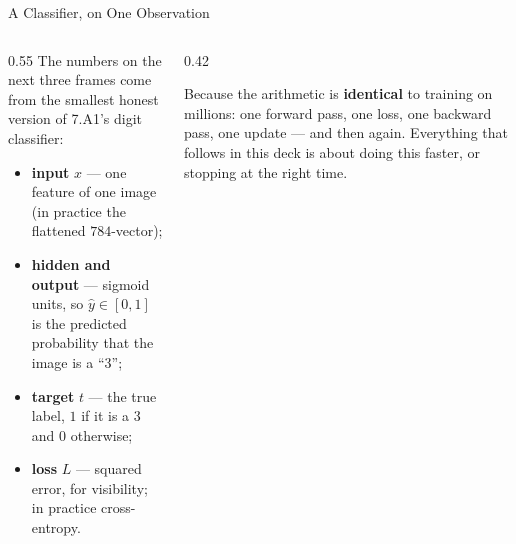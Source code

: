 \begin{frame}{A Classifier, on One Observation}
\begin{columns}[T]
\begin{column}{0.55\textwidth}
\small
The numbers on the next three frames come from the smallest honest version of 7.A1's digit classifier:
\medskip
\begin{itemize}\small\setlength{\itemsep}{1.2mm}
  \item \textbf{input} $x$ --- one feature of one image (in practice the flattened $784$-vector);
  \item \textbf{hidden and output} --- sigmoid units, so $\hat y\in[0,1]$ is the predicted probability that the image is a ``3'';
  \item \textbf{target} $t$ --- the true label, $1$ if it is a 3 and $0$ otherwise;
  \item \textbf{loss} $L$ --- squared error, for visibility; in practice cross-entropy.
\end{itemize}
\end{column}
\begin{column}{0.42\textwidth}
\begin{conceptbox}[title=\textbf{Why one observation?}]\small
Because the arithmetic is \textbf{identical} to training on millions: one forward pass, one loss, one backward pass, one update --- and then again.
\medskip
Everything that follows in this deck is about doing this faster, or stopping at the right time.
\end{conceptbox}
\end{column}
\end{columns}
\end{frame}

